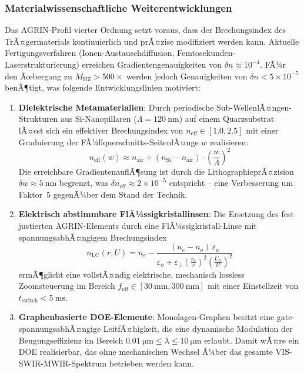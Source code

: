 ﻿\documentclass[12pt,a4paper]{article}
\theoremstyle{definition}
\newcommand{\HZ}{\mathrm{HZ}}
\newcommand{\eff}{\mathrm{eff}}
\begin{document}
	\subsubsection{Materialwissenschaftliche Weiterentwicklungen}

	Das AGRIN-Profil vierter Ordnung setzt voraus, dass der
	Brechungsindex des TrÃ¤germaterials kontinuierlich und prÃ¤zise
	modifiziert werden kann.  Aktuelle Fertigungsverfahren
	(Ionen-Austauschdiffusion, Femtosekunden-Laserstrukturierung)
	erreichen Gradientengenauigkeiten von $\delta n \approx 10^{-4}$.
	FÃ¼r den Ãœbergang zu $M_\HZ > 500\times$ werden jedoch
	Genauigkeiten von $\delta n < 5\times10^{-5}$ benÃ¶tigt, was
	folgende Entwicklungslinien motiviert:

	\begin{enumerate}[label=(\roman*)]
		\item \textbf{Dielektrische Metamaterialien}: Durch periodische
		Sub-WellenlÃ¤ngen-Struktu\-ren aus Si-Nanopillaren
		($\Lambda = \SI{120}{\nano\metre}$) auf einem Quarzsubstrat
		lÃ¤sst sich ein effektiver Brechungsindex von $n_\eff \in [1.0, 2.5]$
		mit einer Graduierung der FÃ¼llquerschnitts-SeitenlÃ¤nge $w$ realisieren:
		\begin{equation}
			n_\eff(w)
			\approx n_\mathrm{air} + (n_\mathrm{Si} - n_\mathrm{air})
			\cdot\left(\frac{w}{\Lambda}\right)^2
			\label{eq:meta_neff}
		\end{equation}
		Die erreichbare GradientenauflÃ¶sung ist durch die
		LithographieprÃ¤zision $\delta w \approx \SI{5}{\nano\metre}$
		begrenzt, was $\delta n_\eff \approx 2\times10^{-5}$ entspricht
		-- eine Verbesserung um Faktor~5 gegenÃ¼ber dem Stand der Technik.

		\item \textbf{Elektrisch abstimmbare FlÃ¼ssigkristallinsen}: Die
		Ersetzung des fest justierten AGRIN-Elements durch eine
		FlÃ¼ssigkristall-Linse mit spannungsabhÃ¤ngigem Brechungsindex
		\begin{equation}
			n_\mathrm{LC}(r, U)
			= n_e -
			\frac{(n_e - n_o)\,\varepsilon_a}{\varepsilon_a
				+ \varepsilon_\perp\!\left(\frac{r_0}{r}\right)^2\!
				\left(\frac{U_\pi}{U}\right)^2}
			\label{eq:lc_index}
		\end{equation}
		ermÃ¶glicht eine vollstÃ¤ndig elektrische, mechanisch lossless
		Zoomsteuerung im Bereich $f_\eff \in [\SI{30}{\milli\metre},
		\SI{300}{\milli\metre}]$ mit einer Einstellzeit von
		$t_\mathrm{switch} < \SI{5}{\milli\second}$.

		\item \textbf{Graphenbasierte DOE-Elemente}: Monolagen-Graphen
		besitzt eine gate-span\-nungsabhÃ¤ngige LeitfÃ¤higkeit, die eine
		dynamische Modulation der Beugungseffizienz im Bereich
		$\SI{0.01}{\micro\metre} \leq \lambda \leq \SI{10}{\micro\metre}$
		erlaubt.  Damit wÃ¤re ein DOE realisierbar, das ohne mechanischen
		Wechsel Ã¼ber das gesamte VIS-SWIR-MWIR-Spektrum betrieben
		werden kann.
	\end{enumerate}
\end{document}
